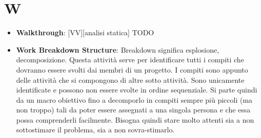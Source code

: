 %
%
%
%

\section{W}

\begin{itemize}

	\item \textbf{Walkthrough}: [VV][analisi statica] TODO

	\item \textbf{Work Breakdown Structure}: Breakdown significa esplosione, decomposizione. Questa attività serve per identificare tutti i compiti che dovranno essere svolti dai membri di un progetto. I compiti sono appunto delle attività che si compongono di altre sotto attività. Sono unicamente identificate e possono non essere svolte in ordine sequenziale. \newline
Si parte quindi da un macro obiettivo fino a decomporlo in compiti sempre più piccoli (ma non troppo) tali da poter essere assegnati a una singola persona e che essa possa comprenderli facilmente. \newline
Bisogna quindi stare molto attenti sia a non sottostimare il problema, sia a non sovra-stimarlo.

\end{itemize}